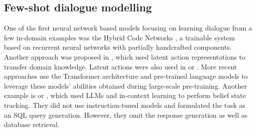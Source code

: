 \subsection{Few-shot dialogue modelling}
One of the first neural network based models focusing on learning dialogue from a few in-domain examples was the Hybrid Code Networks  \cite{williams-etal-2017-hybrid}, a trainable system based on recurrent neural networks with partially handcrafted components.
Another approach was proposed in \citet{zhao-eskenazi-2018-zero}, which used latent action representations to transfer domain knowledge.
Latent actions were also used in \citet{huang2020mala} or \citet{shalyminov-etal-2019-data}.
More recent approaches use the Transformer architecture and pre-trained language models \cite{shalyminov_fast_2020} to leverage these models' abilities obtained during large-scale pre-training.
Another example is \citet{madotto2020language} or
\citet{hu-etal-2022-context}, which used LLMs and in-context learning to perform belief state tracking.
They did not use instruction-tuned models and formulated the task as an SQL query generation.
However, they omit the response generation as well as database retrieval.